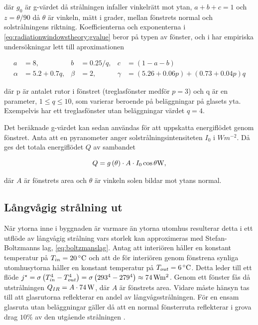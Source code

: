 där $g_0$ är g-värdet då strålningen infaller vinkelrätt mot ytan, $a+b+c=1$ och $z=\theta/90$ då $\theta$ är vinkeln, mätt i grader, mellan fönstrets normal och solstrålningens riktning. Koefficienterna och exponenterna i \eqref{eq:radiationwindowstheory:gvalue} beror på typen av fönster, och i \cite{karlssonroos99} har empiriska undersökningar lett till aproximationen

\begin{align}\label{eq:gconstants}
a & = 8, & b & = 0.25/q, & c & = (1-a-b) \nonumber \\
\alpha & = 5.2 + 0.7q, & \beta & = 2, & \gamma & = (5.26+0.06p) + (0.73+0.04p)q
\end{align}

där p är antalet rutor i fönstret (treglasfönster medför $p = 3$) och q är en parameter, $1 \le q \le 10$, som varierar beroende på beläggningar på glasets yta. Exempelvis har ett treglasfönster utan beläggningar värdet $q=4$.

Det beräknade g-värdet kan sedan användas för att uppskatta energiflödet genom fönstret. Anta att en pyranometer anger solstrålningsintensiteten $I_0$ i $\unit{W m^{-2}}$. Då ges det totala energiflödet $Q$ av sambandet 

\begin{equation}\label{eq:totalsun}
Q = g \left( \theta \right)\cdot A \cdot I_0 \cos{\theta} \unit[]{W},
\end{equation}

där $A$ är fönstrets area och $\theta$ är vinkeln solen bildar mot ytans normal.

\subsection{Långvågig strålning ut}

När ytorna inne i byggnaden är varmare än ytorna utomhus resulterar detta i ett utflöde av långvågig strålning vars storlek kan approximeras med Stefan-Boltzmanns lag, \ref{eq:boltzmanslag}. Antag att interiören håller en konstant temperatur på $T_{in} = \unit[20]{^{\circ}C}$ och att de för interiören genom fönstrena synliga utomhusytorna håller en konstant temperatur på $T_{out} = \unit[6]{^{\circ}C}$. Detta leder till ett flöde $j^{\star} = \sigma \left( T_{in}^{4}-T_{out}^4\right) = \sigma \left( 293^4-279^4 \right) \approx \unit[74]{Wm^{2}}$. Genom ett fönster fås då utstrålningen $Q_{IR}=A\cdot\unit[74]{W}$, där $A$ är fönstrets area. Vidare måste hänsyn tas till att glasrutorna reflekterar en andel av långvågsstrålningen. För en ensam glasruta utan beläggningar gäller då att en normal fönsterruta reflekterar i grova drag $10\%$ av den utgående strålningen \cite{gelin05}.

